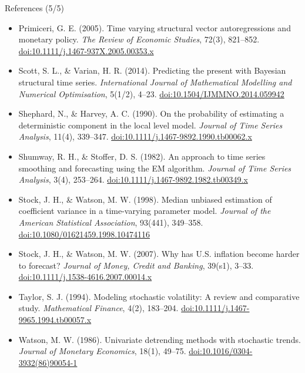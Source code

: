 \begin{frame}{References (5/5)}
\itemsize{\tiny}
\begin{itemize}
    \item Primiceri, G. E. (2005). Time varying structural vector autoregressions and monetary policy. \textit{The Review of Economic Studies}, 72(3), 821--852. \href{https://doi.org/10.1111/j.1467-937X.2005.00353.x}{doi:10.1111/j.1467-937X.2005.00353.x}
    \item Scott, S. L., \& Varian, H. R. (2014). Predicting the present with Bayesian structural time series. \textit{International Journal of Mathematical Modelling and Numerical Optimisation}, 5(1/2), 4--23. \href{https://doi.org/10.1504/IJMMNO.2014.059942}{doi:10.1504/IJMMNO.2014.059942}
    \item Shephard, N., \& Harvey, A. C. (1990). On the probability of estimating a deterministic component in the local level model. \textit{Journal of Time Series Analysis}, 11(4), 339--347. \href{https://doi.org/10.1111/j.1467-9892.1990.tb00062.x}{doi:10.1111/j.1467-9892.1990.tb00062.x}
    \item Shumway, R. H., \& Stoffer, D. S. (1982). An approach to time series smoothing and forecasting using the EM algorithm. \textit{Journal of Time Series Analysis}, 3(4), 253--264. \href{https://doi.org/10.1111/j.1467-9892.1982.tb00349.x}{doi:10.1111/j.1467-9892.1982.tb00349.x}
    \item Stock, J. H., \& Watson, M. W. (1998). Median unbiased estimation of coefficient variance in a time-varying parameter model. \textit{Journal of the American Statistical Association}, 93(441), 349--358. \href{https://doi.org/10.1080/01621459.1998.10474116}{doi:10.1080/01621459.1998.10474116}
    \item Stock, J. H., \& Watson, M. W. (2007). Why has U.S. inflation become harder to forecast? \textit{Journal of Money, Credit and Banking}, 39(s1), 3--33. \href{https://doi.org/10.1111/j.1538-4616.2007.00014.x}{doi:10.1111/j.1538-4616.2007.00014.x}
    \item Taylor, S. J. (1994). Modeling stochastic volatility: A review and comparative study. \textit{Mathematical Finance}, 4(2), 183--204. \href{https://doi.org/10.1111/j.1467-9965.1994.tb00057.x}{doi:10.1111/j.1467-9965.1994.tb00057.x}
    \item Watson, M. W. (1986). Univariate detrending methods with stochastic trends. \textit{Journal of Monetary Economics}, 18(1), 49--75. \href{https://doi.org/10.1016/0304-3932(86)90054-1}{doi:10.1016/0304-3932(86)90054-1}
\end{itemize}
\end{frame}


